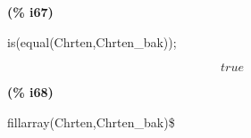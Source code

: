 \documentclass[fleqn]{article}
\begin{document}
\noindent%



\noindent
\begin{minipage}[t]{4.000000em}\color{red}\bfseries
(\% i67)	
\end{minipage}
\begin{minipage}[t]{\textwidth}\color{blue}
is(equal(Chrten,Chrten\_bak));
\end{minipage}
\[\displaystyle \tag{\% o67} 
true\mbox{}
\]


\noindent
\begin{minipage}[t]{4.000000em}\color{red}\bfseries
(\% i68)	
\end{minipage}
\begin{minipage}[t]{\textwidth}\color{blue}
fillarray(Chrten,Chrten\_bak)\$
\end{minipage}

\noindent%
\end{document}
